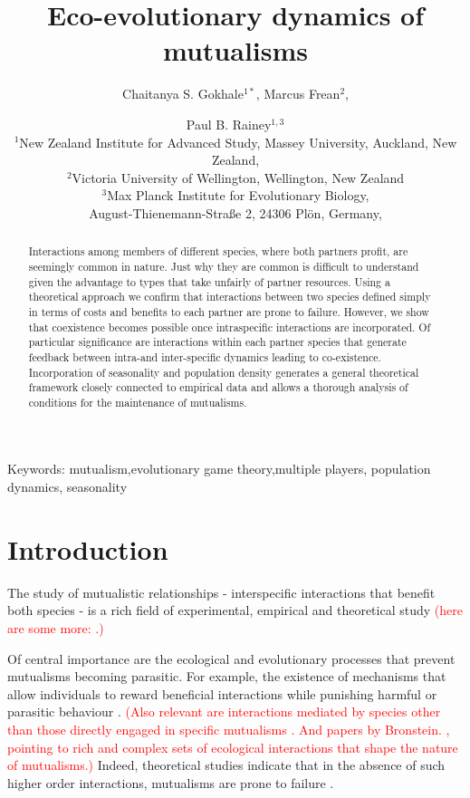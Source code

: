 \documentclass[12pt]{article}
\title{\vspace*{-22mm}\bf Eco-evolutionary dynamics of mutualisms}
\author{Chaitanya S. Gokhale$^{1*}$,
Marcus Frean$^{2}$,
 \and Paul B. Rainey$^{1,3}$ \\
\normalsize $^{1}$New Zealand Institute for Advanced Study, Massey University, Auckland, New Zealand, \\
\normalsize $^2$Victoria University of Wellington, Wellington, New Zealand\\
\normalsize $^3$Max Planck Institute for Evolutionary Biology, \\
\normalsize August-Thienemann-Stra{\ss}e 2, 24306 Pl\"{o}n, Germany,\\
}
\date{}
\newcommand{\paul}[1]{\textcolor{red}{(#1)}}
\begin{document}
\maketitle

\begin{abstract}
Interactions among members of different species, where both partners profit, are seemingly common in nature. 
Just why they are common is difficult to understand given the advantage to types that take unfairly of partner resources. 
Using a theoretical approach we confirm that interactions between two species defined simply in terms of costs and benefits to each partner are prone to failure. 
However, we show that coexistence becomes possible once intraspecific interactions are incorporated. Of particular significance are interactions within each partner species that generate feedback between intra-and inter-specific dynamics leading to co-existence. 
Incorporation of seasonality and population density generates a general theoretical framework closely connected to empirical data and allows a thorough analysis of conditions for the maintenance of mutualisms.
\end{abstract}

\noindent
Keywords: mutualism,evolutionary game theory,multiple players, population dynamics, seasonality

\tableofcontents

\section{Introduction}
The study of mutualistic relationships - interspecific interactions that benefit both species - is a rich field of experimental, empirical and theoretical study \citep{boucher:book:1985,hinton:PTENHS:1951,wilson:AmNat:1983,bronstein:QRB:1994,poulin:JTB:1995,noe:book:2001,johnstone:ECL:2002,pierce:ARE:2002,kiers:Nature:2003,bergstrom:PNAS:2003,hoeksema:AmNat:2003,bshary:ASB:2004,akcay:PRSB:2007,bshary:Nature:2008,gokhale:PRSB:2012,archetti:JTB:2013} \paul{here are some more: \citep{wardle:Science:2004,jones:PNAS:2004,klein:PRSB:2007,hardy:Science:1975,sachs:TREE:2006}.}

Of central importance are the ecological and evolutionary processes that prevent mutualisms becoming parasitic. 
For example, the existence of mechanisms that allow individuals to reward beneficial interactions while punishing harmful or parasitic behaviour \citep{west:JEB:2002}.
\paul{Also relevant are interactions mediated by species other than those directly engaged in specific mutualisms \citep{palmer:Science:2008}. 
And papers by Bronstein. \citep{visick:JB:2000,warren:GCB:2014,mcfallngai:PLoSB:2014}, pointing to rich and complex sets of ecological interactions that shape the nature of mutualisms.}
Indeed, theoretical studies indicate that in the absence of such higher order interactions, mutualisms are prone to failure \citep{doebeli:PNAS:1998}.
\end{document}
